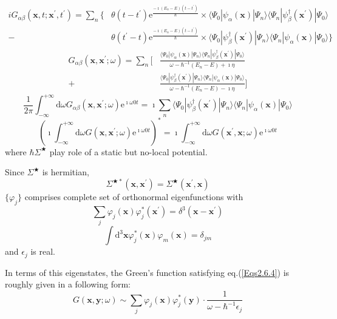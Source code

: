 \[ \begin{split} iG_{\alpha\beta}(\mathbf{x},t;\mathbf{x}^{'},t^{'}) =
 \sum_{n} \{ &\theta(t-t^{'}) \mathrm{e}^{\frac{-\imath(E_{n}-E)(t-t^{'})}{\hbar}} \times \langle \Psi_{0} | \psi_{\alpha}(\mathbf{x}) | \Psi_{n} \rangle \langle \Psi_{n} | \psi_{\beta}^{\dagger}(\mathbf{x}^{'}) | \Psi_{0} \rangle  \\
- \ &\theta(t^{'}-t) \mathrm{e}^{\frac{-\imath(E_{n}-E)(t-t^{'})}{\hbar}} \times \langle \Psi_{0} | \psi_{\beta}^{\dagger}(\mathbf{x}^{'}) | \Psi_{n} \rangle \langle \Psi_{n} | \psi_{\alpha}(\mathbf{x}) | \Psi_{0} \rangle \}
\end{split} \]
\[ \begin{split} G_{\alpha\beta}(\mathbf{x},\mathbf{x}^{'};\omega) = \sum_{n} [ 
&\frac{\langle \Psi_{0} | \psi_{\alpha}(\mathbf{x}) | \Psi_{n} \rangle \langle \Psi_{n} | \psi_{\beta}^{\dagger}(\mathbf{x}^{'}) | \Psi_{0} \rangle}{\omega-\hbar^{-1}(E_{n}-E)+\imath\eta} \\
+&\frac{\langle \Psi_{0} | \psi_{\beta}^{\dagger}(\mathbf{x}^{'}) | \Psi_{n} \rangle \langle \Psi_{n} | \psi_{\alpha}(\mathbf{x}) | \Psi_{0} \rangle}{\omega-\hbar^{-1}(E_{n}-E)-\imath\eta} ]
\end{split} \]
\[ \frac{1}{2\pi} \int_{-\infty}^{+\infty} \mathrm{d}\omega G_{\alpha\beta}(\mathbf{x},\mathbf{x}^{'};\omega)\mathrm{e}^{\imath\omega 0 t} = \imath \sum_{n} \langle \Psi_{0} | \psi_{\beta}^{\dagger}(\mathbf{x}^{'}) | \Psi_{n} \rangle \langle \Psi_{n} | \psi_{\alpha}(\mathbf{x}) | \Psi_{0} \rangle \]
\[ {\left ( \imath \int_{-\infty}^{+\infty} \mathrm{d} \omega G(\mathbf{x},\mathbf{x}^{'};\omega)\mathrm{e}^{\imath \omega 0 t} \right )}^{*} = \imath \int_{-\infty}^{+\infty} \mathrm{d} \omega G(\mathbf{x}^{'},\mathbf{x};\omega)\mathrm{e}^{\imath \omega 0 t} \]
where $\hbar\Sigma^\bigstar$ play role of a static but no-local potential.

Since $\Sigma^\bigstar$ is hermitian,\[\Sigma^{\bigstar*}(\mathbf{x},\mathbf{x}^{'}) = \Sigma^\bigstar(\mathbf{x}^{'},\mathbf{x}) \]
$\{\varphi_{j}\}$ comprises complete set of orthonormal eigenfunctions with
\[ \sum_{j} \varphi_{j}(\mathbf{x})\varphi_{j}^{*}(\mathbf{x}^{'}) = \delta^{3}(\mathbf{x}-\mathbf{x}^{'}) \]
\[ \int \mathrm{d}^3 \mathbf{x} \varphi_j^*(\mathbf{x})\varphi_m(\mathbf{x}) = \delta_{jm} \]
and $\epsilon_j$ is real.

In terms of this eigenstates, the Green's function satisfying eq.(\ref{Eqs2.6.4}) is roughly given in a following form:
\[ G(\mathbf{x},\mathbf{y};\omega) \sim \sum_j \varphi_j(\mathbf{x})\varphi_j^*(\mathbf{y}) \cdot \frac{1}{\omega-\hbar^{-1}\epsilon_j} \]


